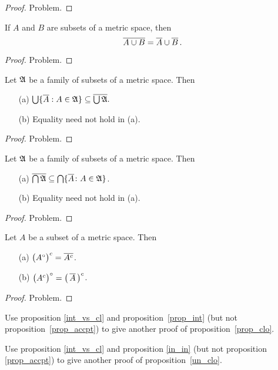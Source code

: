 \begin{proof} Problem.  \ns \end{proof}

\begin{prop}\label{un_clo} If $A$ and $B$ are subsets of a metric space, then
  \[ \overline{A \cup B} = \overline{A} \cup \overline{B}\,. \]
\end{prop}

\begin{proof} Problem.  \ns  \end{proof}

\begin{prop} Let $\mathfrak{A}$ be a family of subsets of a metric space.  Then
 \begin{enumerate}
  \item[(a)] $\bigcup\{\overline{A}: A \in \mathfrak{A}\} \subseteq \overline{\bigcup \mathfrak{A}}.$
  \item[(b)] Equality need not hold in \textup{(a)}.
 \end{enumerate}
\end{prop}

\begin{proof} Problem.  \ns  \end{proof}

\begin{prop}\label{intr_cl} Let $\mathfrak{A}$ be a family of subsets of a metric space.
Then
 \begin{enumerate}
  \item[(a)] $\overline{\bigcap \mathfrak{A}} \subseteq \bigcap \{\overline{A} \colon A \in \mathfrak{A}\}$.
  \item[(b)] Equality need not hold in \textup{(a)}.
 \end{enumerate}
\end{prop}

\begin{proof} Problem.  \ns  \end{proof}

\begin{prop}\label{int_vs_cl} Let $A$ be a subset of a metric space.  Then
 \begin{enumerate}
  \item[(a)]  $\bigl(A^{\circ} \bigr)^c = \overline{A^c}$.
  \item[(b)]  $\bigl(A^c\bigr)^{\circ} = \bigl(\,\overline{A} \,\bigr)^c$.
 \end{enumerate}
\end{prop}

\begin{proof} Problem.  \ns  \end{proof}

\begin{prob} Use proposition \ref{int_vs_cl} and proposition~\ref{prop_int} (but not
proposition~\ref{prop_accpt}) to give another proof of proposition~\ref{prop_clo}.
\end{prob}

\begin{prob} Use proposition \ref{int_vs_cl} and proposition \ref{in_in} (but not
proposition \ref{prop_accpt}) to give another proof of proposition~\ref{un_clo}.
\end{prob}




\endinput
